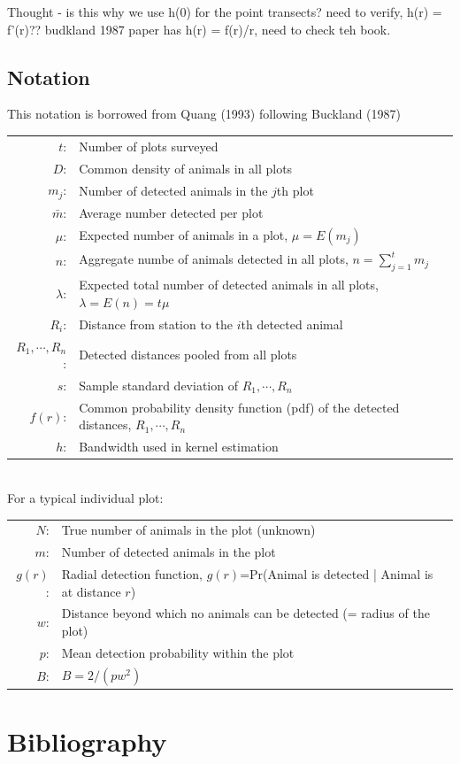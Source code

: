 \documentclass[12pt]{article}
\begin{document}
Thought - is this why we use h(0) for the point transects? need to verify, h(r) = f'(r)??  budkland 1987 paper has h(r) = f(r)/r, need to check teh book.




\subsection{Notation}
This notation is borrowed from Quang (1993) following Buckland (1987)

\begin{tabular}{r l}
$t$:	&	Number of plots surveyed\\
$D$:	& Common density of animals in all plots\\
$m_j$:	& Number of detected animals in the $j$th plot\\
$\bar m$:	& Average number detected per plot\\
$\mu$:	& Expected number of animals in a plot, $\mu = E(m_j)$\\
$n$:	& Aggregate numbe of animals detected in all plots, $n=\sum_{j=1}^t m_j$\\
$\lambda$:	&	Expected total number of detected animals in all plots, $\lambda=E(n)=t\mu$\\
$R_i$:	& Distance from station to the $i$th detected animal\\
$R_1,\cdots,R_n$: & Detected distances pooled from all plots\\
$s$:	& Sample standard deviation of $R_1,\cdots,R_n$\\
$f(r)$: & Common probability density function (pdf) of the detected distances, $R_1,\cdots,R_n$\\
$h$: 	& Bandwidth used in kernel estimation
\end{tabular}\\

For a typical individual plot:

\begin{tabular}{r l}
$N$:	&	True number of animals in the plot (unknown)\\
$m$:	&	Number of detected animals in the plot\\
$g(r)$:	&	Radial detection function, $g(r)$=Pr(Animal is detected | Animal is at distance $r$)\\
$w$:	&	Distance beyond which no animals can be detected (= radius of the plot)\\
$p$:	& Mean detection probability within the plot\\
$B$:	&   $B = 2/(pw^2)$\\

\end{tabular}


\section{Bibliography}

\printbibliography
%
%
\end{document}
